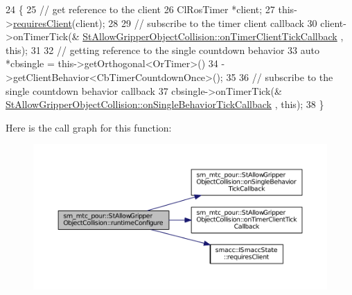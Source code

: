 \begin{DoxyCode}
24     \{
25         \textcolor{comment}{// get reference to the client}
26         ClRosTimer *client;
27         this->\hyperlink{classsmacc_1_1ISmaccState_a7f95c9f0a6ea2d6f18d1aec0519de4ac}{requiresClient}(client);
28 
29         \textcolor{comment}{// subscribe to the timer client callback}
30         client->onTimerTick(&
      \hyperlink{structsm__mtc__pour_1_1StAllowGripperObjectCollision_a337be64b930542f9c6dac6ee51fe7c28}{StAllowGripperObjectCollision::onTimerClientTickCallback}
      , \textcolor{keyword}{this});
31 
32         \textcolor{comment}{// getting reference to the single countdown behavior}
33         \textcolor{keyword}{auto} *cbsingle = this->getOrthogonal<OrTimer>()
34                              ->getClientBehavior<CbTimerCountdownOnce>();
35 
36         \textcolor{comment}{// subscribe to the single countdown behavior callback}
37         cbsingle->onTimerTick(&
      \hyperlink{structsm__mtc__pour_1_1StAllowGripperObjectCollision_aede416032e1e41962e171bbd4e3e7617}{StAllowGripperObjectCollision::onSingleBehaviorTickCallback}
      , \textcolor{keyword}{this});
38     \}
\end{DoxyCode}


Here is the call graph for this function\+:
\nopagebreak
\begin{figure}[H]
\begin{center}
\leavevmode
\includegraphics[width=350pt]{structsm__mtc__pour_1_1StAllowGripperObjectCollision_a6c7ce25c5f50ead0ddcaaeb5b5046ba2_cgraph}
\end{center}
\end{figure}


